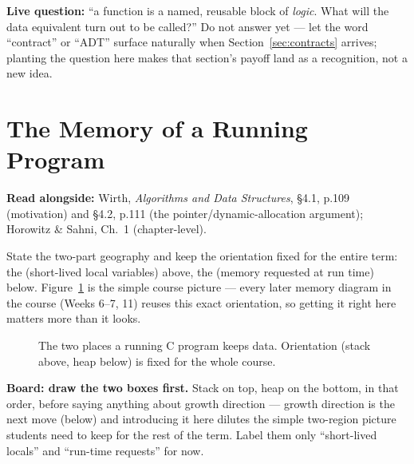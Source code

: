 \documentclass[11pt]{article}
\begin{document}
\textbf{Live question:} ``a function is a named, reusable block of \emph{logic}. What will the data equivalent turn out to be called?'' Do not answer yet --- let the word ``contract'' or ``ADT'' surface naturally when Section~\ref{sec:contracts} arrives; planting the question here makes that section's payoff land as a recognition, not a new idea.

\section{The Memory of a Running Program}
\label{sec:memory}

\textbf{Read alongside:} Wirth, \textit{Algorithms and Data Structures}, \S4.1, p.109 (motivation) and \S4.2, p.111 (the pointer/dynamic-allocation argument); Horowitz \& Sahni, Ch.~1 (chapter-level).

State the two-part geography and keep the orientation fixed for the entire term: the  (short-lived local variables) above, the  (memory requested at run time) below. Figure~\ref{fig:two-places} is the simple course picture --- every later memory diagram in the course (Weeks 6--7, 11) reuses this exact orientation, so getting it right here matters more than it looks.

\begin{figure}[h]
  \centering
  \caption{The two places a running C program keeps data. Orientation (stack
  above, heap below) is fixed for the whole course.}
  \label{fig:two-places}
\end{figure}

\textbf{Board: draw the two boxes first.} Stack on top, heap on the bottom, in that order, before saying anything about growth direction --- growth direction is the next move (below) and introducing it here dilutes the simple two-region picture students need to keep for the rest of the term. Label them only ``short-lived locals'' and ``run-time requests'' for now.
\end{document}
